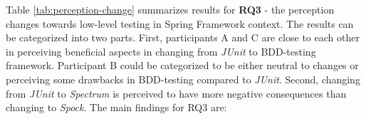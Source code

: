 {\renewcommand{\arraystretch}{1.3}
\begin{table}[H]
        \caption {Developer perception changes of low-level testing} \label{tab:perception-change}
\end{table}
}
\restoregeometry
Table \ref{tab:perception-change} summarizes results for \textbf{RQ3} - the perception changes towards low-level testing in Spring Framework context.
The results can be categorized into two parts. First, participants A and C are close to each other in perceiving beneficial
aspects in changing from \textit{JUnit} to BDD-testing framework. Participant B could be categorized to be either neutral to changes
or perceiving some drawbacks in BDD-testing compared to \textit{JUnit}. Second, changing from \textit{JUnit} to \textit{Spectrum} is perceived to have more negative consequences
than changing to \textit{Spock}. The main findings for RQ3 are:

